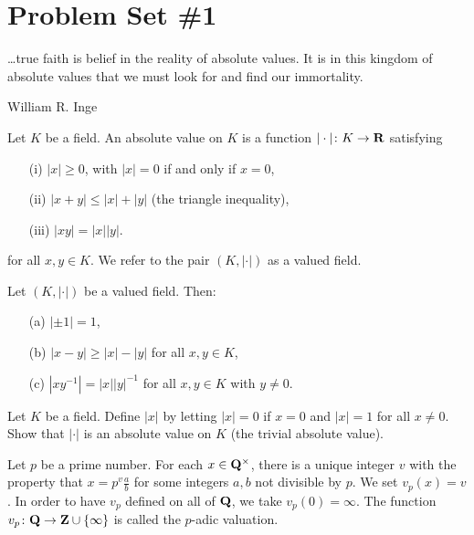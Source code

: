 %
%
%
\chapter*{Problem Set \#1}
\thispagestyle{plain}
\absvalfirst
\epigraph{\dots true faith is belief in the reality of absolute values. It is in this kingdom
of absolute values that we must look for and find our
immortality.}{William R. Inge}


Let $K$ be a field. An \textsf{absolute value} on $K$ is a function $|\cdot|\colon K \to \mathbf{R}$ satisfying
\begin{enumerate}
\item[(i)] $|x| \ge 0$, with $|x|=0$ if and only if $x=0$,
\item[(ii)] $|x+y| \le |x| + |y|$ (the \textsf{triangle inequality}),
\item[(iii)] $|xy| = |x| |y|$.   
\end{enumerate}
for all $x,y \in K$. We refer to the pair $(K,|\cdot|)$ as a \textsf{valued field}.

\begin{prob}\label{prob:01} Let $(K, |\cdot|)$ be a valued field. Then:
\begin{enumerate}
\item[(a)] $|\pm 1| = 1$,
\item[(b)] $|x-y| \ge |x|-|y|$ for all $x, y \in K$,
\item[(c)] $|x y^{-1}| = |x| |y|^{-1}$ for all $x, y \in K$ with $y\ne 0$.
\end{enumerate}
\end{prob}

\begin{prob}\label{prob:02} Let $K$ be a field. Define $|x|$ by letting $|x|=0$ if $x=0$ and $|x|=1$ for all $x\ne 0$. Show that $|\cdot|$ is an absolute value on $K$ (the \textsf{trivial absolute value}).
\end{prob}

\vspace{-0.22in}
\testrule
Let $p$ be a prime number. For each $x \in \mathbf{Q}^{\times}$, there is a unique integer $v$ with the property that $x = p^v \frac{a}{b}$ for some integers $a,b$ not divisible by $p$. We set $v_p(x) = v$. In order to have $v_p$ defined on all of $\mathbf{Q}$, we take $v_p(0)= \infty$. The function $v_p\colon \mathbf{Q}\to \mathbf{Z}\cup\{\infty\}$ is called the \textsf{$p$-adic valuation}.
\testruletwo


